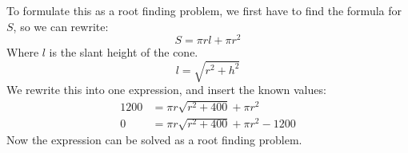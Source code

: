 To formulate this as a root finding problem, we first have to find the formula for $S$, so we can rewrite:
$$
S = \pi r l + \pi r^2
$$
Where $l$ is the slant height of the cone.
$$
l = \sqrt{r^2+h^2}
$$
We rewrite this into one expression, and insert the known values:
\begin{align*}
  1200 &= \pi r \sqrt{r^2+400} + \pi r^2 \\
  0 &= \pi r \sqrt{r^2+400} + \pi r^2 - 1200
\end{align*}
Now the expression can be solved as a root finding problem.
